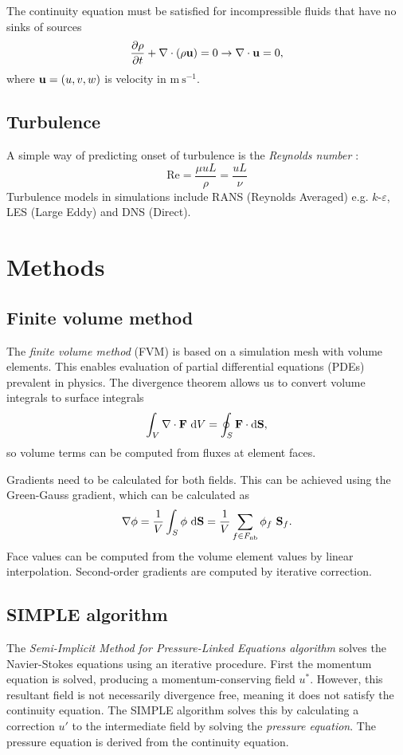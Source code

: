 \documentclass[12pt]{article}
\newcommand{\D}{\text{d}}
\newcommand{\un}[1]{ \text{#1}}
\newcommand{\up}[2]{\text{#1}^{#2}} %
\newcommand{\vb}[1]{\text{\textbf{#1}}}
\newcommand{\x}{\text}
\newcommand{\fnb}{F_{\x{nb}}}
\begin{document}
The continuity equation must be satisfied for incompressible fluids that have no sinks of sources
\begin{equation}
  \frac{\partial \rho}{\partial t} + \nabla \cdot (\rho \vb u) = 0 \rightarrow \nabla \cdot \vb u = 0,
\end{equation}
where $\vb u = (u, v, w)$ is velocity in $\un{m} \ \up{s}{-1}$.

\subsection{Turbulence}

A simple way of predicting onset of turbulence is the \textit{Reynolds number} \cite{tri}:
$$
\text{Re} = \frac{\mu u L}{\rho} = \frac{u L}{\nu}
$$
Turbulence models in simulations include RANS (Reynolds Averaged) e.g. $k$-$\varepsilon$, LES (Large Eddy) and DNS (Direct).

\section{Methods}

\subsection{Finite volume method}

The \textit{finite volume method} (FVM) is based on a simulation mesh with volume elements. This enables evaluation of partial differential equations (PDEs) prevalent in physics. The divergence theorem allows us to convert volume integrals to surface integrals
$$
\int_V \nabla \cdot \vb F \ \D V = \oint_S \vb F \cdot \D \vb S,
$$
so volume terms can be computed from fluxes at element faces.

Gradients need to be calculated for both fields. This can be achieved using the Green-Gauss gradient, which can be calculated as
$$
\nabla \phi = \frac{1}{V} \int_S \phi \ \D \vb S = \frac{1}{V} \sum_{f \in \fnb} \phi_f \ \vb S_f.
$$
Face values can be computed from the volume element values by linear interpolation. Second-order gradients are computed by iterative correction.

\subsection{SIMPLE algorithm}

The \textit{Semi-Implicit Method for Pressure-Linked Equations algorithm} solves the Navier-Stokes equations using an iterative procedure. First the momentum equation is solved, producing a momentum-conserving field $u^*$. However, this resultant field is not necessarily divergence free, meaning it does not satisfy the continuity equation. The SIMPLE algorithm solves this by calculating a correction $u'$ to the intermediate field by solving the \textit{pressure equation}. The pressure equation is derived from the continuity equation.
\end{document}
